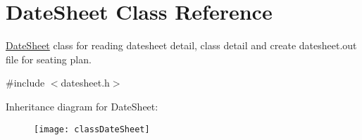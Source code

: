 \hypertarget{classDateSheet}{\section{Date\-Sheet Class Reference}
\label{classDateSheet}
}


\hyperlink{classDateSheet}{Date\-Sheet} class for reading datesheet detail, class detail and create datesheet.\-out file for seating plan.  




{\ttfamily \#include $<$datesheet.\-h$>$}

Inheritance diagram for Date\-Sheet\-:\begin{figure}[H]
\begin{center}
\leavevmode
\texttt{[image: classDateSheet]}
\end{center}
\end{figure}
